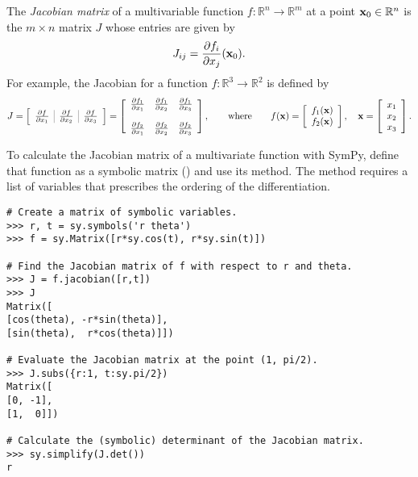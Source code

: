 The \emph{Jacobian matrix} of a multivariable function $f:\mathbb{R}^n \rightarrow \mathbb{R}^m$ at a point $\mathbf{x}_0 \in \mathbb{R}^n$ is the $m \times n$ matrix $J$ whose entries are given by
\begin{equation*}
J_{ij} = \frac{\partial f_i}{\partial x_j}(\mathbf{x}_0).
\end{equation*}
For example, the Jacobian for a function $f:\mathbb{R}^3 \rightarrow \mathbb{R}^2$ is defined by
\[
J = \left[\begin{array}{c|c|c}
\arrayrulecolor{gray}
\frac{\partial f}{\partial x_1}&\frac{\partial f}{\partial x_2}&\frac{\partial f}{\partial x_3}
\end{array}\right]
=
\left[\begin{array}{ccc}
\frac{\partial f_1}{\partial x_1}&\frac{\partial f_1}{\partial x_2}&\frac{\partial f_1}{\partial x_3}
\\ \\
\frac{\partial f_2}{\partial x_1}&\frac{\partial f_2}{\partial x_2}&\frac{\partial f_2}{\partial x_3}
\end{array}\right],
\qquad
\text{where}
\qquad
f(\x) =
\left[\begin{array}{c}
f_1(\x) \\ f_2(\x)
\end{array}\right],
\quad
\x = \left[\begin{array}{c}
x_1 \\ x_2 \\ x_3
\end{array}\right].
\]

To calculate the Jacobian matrix of a multivariate function with SymPy, define that function as a symbolic matrix () and use its  method.
The method requires a list of variables that prescribes the ordering of the differentiation.

\begin{lstlisting}
# Create a matrix of symbolic variables.
>>> r, t = sy.symbols('r theta')
>>> f = sy.Matrix([r*sy.cos(t), r*sy.sin(t)])

# Find the Jacobian matrix of f with respect to r and theta.
>>> J = f.jacobian([r,t])
>>> J
Matrix([
[cos(theta), -r*sin(theta)],
[sin(theta),  r*cos(theta)]])

# Evaluate the Jacobian matrix at the point (1, pi/2).
>>> J.subs({r:1, t:sy.pi/2})
Matrix([
[0, -1],
[1,  0]])

# Calculate the (symbolic) determinant of the Jacobian matrix.
>>> sy.simplify(J.det())
r
\end{lstlisting}

